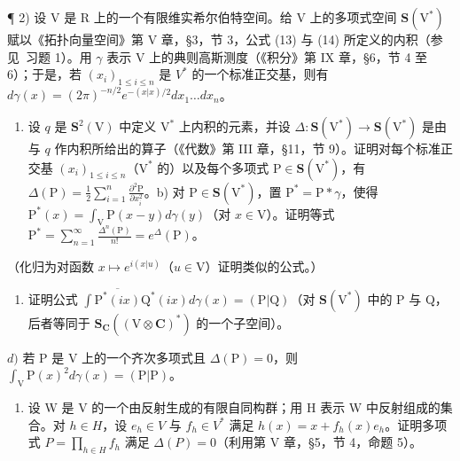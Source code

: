 \begin{enumerate}
¶ 2) 设 V 是 R 上的一个有限维实希尔伯特空间。给 V 上的多项式空间 \(\mathbf{S}(\mathrm{V}^{*})\) 赋以《拓扑向量空间》第 V 章，§3，节 3，公式 (13) 与 (14) 所定义的内积（参见~习题 1）。用 \(\gamma\) 表示 V 上的典则高斯测度（《积分》第 IX 章，§6，节 4 至 6）；于是，若 \((x_{i})_{1\leq i\leq n}\) 是 \(V^{*}\) 的一个标准正交基，则有 \(d\gamma(x)=(2\pi)^{-n/2}e^{-(x|x)/2}dx_{1}\ldots dx_{n}\)。

\begin{enumerate}
\def\labelenumi{\alph{enumi})}
\tightlist
\item
  设 \(q\) 是 \(\mathbf{S}^2(\mathrm{V})\) 中定义 \(\mathrm{V}^*\) 上内积的元素，并设 \(\Delta: \mathbf{S}(\mathrm{V}^*) \to \mathbf{S}(\mathrm{V}^*)\) 是由与 \(q\) 作内积所给出的算子（《代数》第 III 章，§11，节 9）。证明对每个标准正交基 \((x_i)_{1 \leq i \leq n}\)（\(\mathrm{V}^*\) 的）以及每个多项式 \(\mathrm{P} \in \mathbf{S}(\mathrm{V}^*)\)，有 \(\Delta(\mathrm{P}) = \frac{1}{2} \sum_{i=1}^{n} \frac{\partial^2\mathrm{P}}{\partial x_i^2}\)。b) 对 \(\mathrm{P} \in \mathbf{S}(\mathrm{V}^*)\)，置 \(\mathrm{P}^* = \mathrm{P} * \gamma\)，使得 \(\mathrm{P}^*(x) = \int_{\mathrm{V}} \mathrm{P}(x - y) d\gamma(y)\)（对 \(x \in \mathrm{V}\)）。证明等式 \(\mathrm{P}^* = \sum_{n=1}^{\infty} \frac{\Delta^n(\mathrm{P})}{n!} = e^{\Delta}(\mathrm{P})\)。
\end{enumerate}

（化归为对函数 \(x \mapsto e^{i(x|u)}\)（\(u \in \mathrm{V}\)）证明类似的公式。）

\begin{enumerate}
\def\labelenumi{\alph{enumi})}
\setcounter{enumi}{2}
\tightlist
\item
  证明公式 \(\int\overline{\mathrm{P}^{*}(ix)}\mathrm{Q}^{*}(ix)d\gamma(x)=(\mathrm{P}|\mathrm{Q})\)（对 \(\mathbf{S}(\mathrm{V}^{*})\) 中的 P 与 Q，后者等同于 \(\mathbf{S}_{\mathbf{C}}((\mathrm{V}\otimes\mathbf{C})^{*})\) 的一个子空间）。
\end{enumerate}

\(d)\) 若 \(\mathrm{P}\) 是 \(\mathrm{V}\) 上的一个齐次多项式且 \(\Delta (\mathrm{P}) = 0\)，则 \(\int_{\mathrm{V}}\mathrm{P}(x)^2 d\gamma (x) = (\mathrm{P}|\mathrm{P})\)。

\begin{enumerate}
\def\labelenumi{\alph{enumi})}
\setcounter{enumi}{4}
\tightlist
\item
  设 W 是 V 的一个由反射生成的有限自同构群；用 H 表示 W 中反射组成的集合。对 \(h \in H\)，设 \(e_{h} \in V\) 与 \(f_{h} \in V^{*}\) 满足 \(h(x) = x + f_{h}(x)e_{h}\)。证明多项式 \(P = \prod_{h \in H} f_{h}\) 满足 \(\Delta(P) = 0\)（利用第 V 章，§5，节 4，命题 5）。
\end{enumerate}


\end{enumerate}

